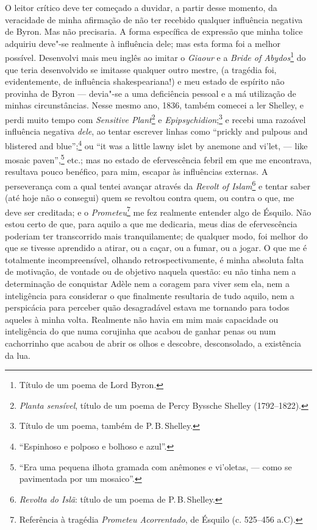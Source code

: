 O leitor crítico deve ter começado a duvidar, a partir desse
momento, da veracidade de minha afirmação de não ter recebido qualquer
influência negativa de Byron. Mas não precisaria. A forma específica de
expressão que minha tolice adquiriu deve"-se realmente à influência dele;
mas esta forma foi a melhor possível. Desenvolvi mais meu inglês ao
imitar o \textit{Giaour} e a \textit{Bride of Abydos}\footnote{Título de um
  poema de Lord Byron.} do que teria desenvolvido se
imitasse qualquer outro mestre, (a tragédia foi, evidentemente, de
influência shakespeariana!) e meu estado de espírito não provinha de
Byron --- devia"-se a uma deficiência pessoal e a má utilização de minhas
circunstâncias. Nesse mesmo ano, 1836, também comecei a ler Shelley, e
perdi muito tempo com \textit{Sensitive Plant}\footnote{\textit{Planta
  sensível}, título de um poema de Percy Byssche Shelley (1792--1822).} e \textit{Epipsychidion};\footnote{Título de um poema, também de
  P.\,B.\,Shelley.} e recebi uma
razoável influência negativa \textit{dele}, ao tentar escrever linhas como
``prickly and pulpous and blistered and blue'';\footnote{``Espinhoso
  e polposo e bolhoso e azul''.} ou ``it was a
little lawny islet by anemone and vi'let, --- like mosaic
paven'',\footnote{``Era uma pequena ilhota gramada com anêmones e
  vi'oletas, --- como se pavimentada por um mosaico''.}
etc.; mas no estado de efervescência febril em que me encontrava,
resultava pouco benéfico, para mim, escapar às influências externas. A
perseverança com a qual tentei avançar através da \textit{Revolt of
Islam}\footnote{\textit{Revolta do Islã}: título de um poema de P.\,B.\,Shelley.} e tentar saber (até hoje
não o consegui) quem se revoltou contra quem, ou contra o que, me deve
ser creditada; e o \textit{Prometeu}\footnote{Referência à tragédia
  \textit{Prometeu Acorrentado}, de Ésquilo (c. 525--456 a.C).} me fez realmente entender algo de Ésquilo. Não estou
certo de que, para aquilo a que me dedicaria, meus dias de efervescência
poderiam ter transcorrido mais tranquilamente; de qualquer modo, foi
melhor do que se tivesse aprendido a atirar, ou a caçar, ou a fumar, ou
a jogar. O que me é totalmente incompreensível, olhando
retrospectivamente, é minha absoluta falta de motivação, de vontade ou
de objetivo naquela questão: eu não tinha nem a determinação de
conquistar Adèle nem a coragem para viver sem ela, nem a inteligência
para considerar o que finalmente resultaria de tudo aquilo, nem a
perspicácia para perceber quão desagradável estava me tornando para
todos aqueles à minha volta. Realmente não havia em mim mais capacidade
ou inteligência do que numa corujinha que acabou de ganhar penas ou num
cachorrinho que acabou de abrir os olhos e descobre, desconsolado, a
existência da lua.

